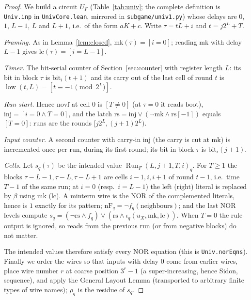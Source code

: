 \documentclass[11pt]{article}
\theoremstyle{definition}
\newcommand{\low}{\operatorname{low}}
\newcommand{\Run}{\operatorname{Run}}
\begin{document}
\begin{proof}
We build a circuit $U_F$ (Table~\ref{tab:univ}; the complete definition is \texttt{Univ.inp} in
\texttt{UnivCore.lean}, mirrored in \texttt{subgame/univ1.py}) whose delays are $0$, $1$, $L-1$, $L$
and $L+1$, i.e.\ of the form $aK+c$.  Write $\tau=tL+i$ and $t=j2^L+T$.

\emph{Framing.}  As in Lemma~\ref{lem:closed}, $\mathrm{mk}(\tau)=[i=0]$; reading $\mathrm{mk}$ with delay $L-1$
gives $\mathrm{lc}(\tau)=[i=L-1]$.

\emph{Timer.}  The bit-serial counter of Section~\ref{sec:counter} with register length $L$: its bit in
block $\tau$ is $\mathrm{bit}_i(t+1)$ and its carry out of the last cell of round $t$ is
$\low(t,L)=[t\equiv-1\pmod{2^L}]$.

\emph{Run start.}  Hence $\mathrm{novf}$ at cell $0$ is $[T\ne0]$ (at $\tau=0$ it reads $\mathrm{boot}$),
$\mathrm{inj}=[i=0\wedge T=0]$, and the latch $\mathrm{rs}=\mathrm{inj}\vee(\neg\mathrm{mk}\wedge\mathrm{rs}[-1])$ equals
$[T=0]$: runs are the rounds $[j2^L,(j+1)2^L)$.

\emph{Input counter.}  A second counter with carry-in $\mathrm{inj}$ (the carry is cut at $\mathrm{mk}$) is
incremented once per run, during its first round; its bit in block $\tau$ is $\mathrm{bit}_i(j+1)$.

\emph{Cells.}  Let $s_q(\tau)$ be the intended value $\Run_F(L,j+1,T,i)_q$.  For $T\ge1$ the blocks
$\tau-L-1,\tau-L,\tau-L+1$ are cells $i-1,i,i+1$ of round $t-1$, i.e.\ time $T-1$ of the same run; at
$i=0$ (resp.\ $i=L-1$) the left (right) literal is replaced by $\beta$ using $\mathrm{mk}$ ($\mathrm{lc}$).  A
minterm wire is the NOR of the complemented literals, hence is $1$ exactly for its pattern;
$\mathrm{nF}_q=\neg f_q(\text{neighbours})$; and the last NOR levels compute
$s_q=(\neg\mathrm{rs}\wedge f_q)\vee(\mathrm{rs}\wedge\iota_q(u_X,\mathrm{mk},\mathrm{lc}))$.  When $T=0$ the rule
output is ignored, so reads from the previous run (or from negative blocks) do not matter.

The intended values therefore satisfy every NOR equation (this is \texttt{Univ.norEqns}).  Finally we
order the wires so that inputs with delay $0$ come from earlier wires, place wire number $r$ at coarse
position $3^r-1$ (a super-increasing, hence Sidon, sequence), and apply the General Layout Lemma
(transported to arbitrary finite types of wire names); $\rho_q$ is the residue of $s_q$.
\end{proof}
\end{document}
